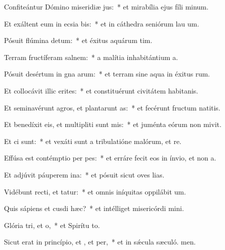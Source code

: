 \item Confiteántur Dómino miseridiæ jus:~* et mirabília ejus fíli minum.
\item Et exáltent eum in ecsia bis:~* et in cáthedra seniórum lau um.
\item Pósuit flúmina  detum:~* et éxitus aquárum  tim.
\item Terram fructíferam  salnem:~* a malítia inhabitántium  a.
\item Pósuit desértum in gna arum:~* et terram sine aqua in éxitus rum.
\item Et collocávit illic erites:~* et constituérunt civitátem habitanis.
\item Et seminavérunt agros, et plantarunt as:~* et fecérunt fructum natitis.
\item Et benedíxit eis, et multipliti sunt mis:~* et juménta eórum non mivit.
\item Et ci  sunt:~* et vexáti sunt a tribulatióne malórum, et re.
\item Effúsa est contémptio per pes:~* et erráre fecit eos in ínvio, et non  a.
\item Et adjúvit páuperem  ina:~* et pósuit sicut oves lias.
\item Vidébunt recti, et tatur:~* et omnis iníquitas oppilábit  um.
\item Quis sápiens et cusdi hæc?~* et intélliget misericórdi mini.
\item Glória tri, et o,~* et Spirítu to.
\item Sicut erat in princípio, et , et per,~* et in sǽcula sæculó. men.
